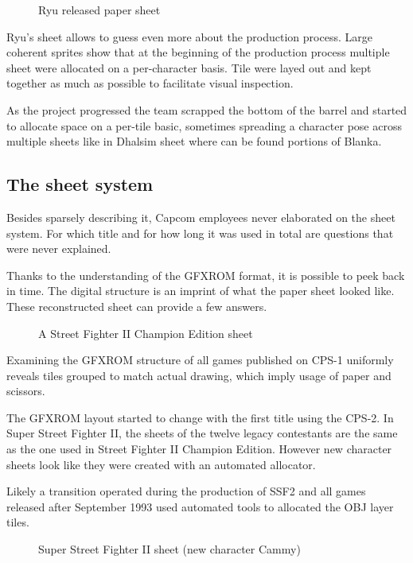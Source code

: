  \begin{figure}[H]
\caption*{Ryu released paper sheet}
\end{figure}

Ryu's sheet  allows to guess even more about the production process. Large coherent sprites show that at the beginning of the production process multiple sheet were allocated on a per-character basis. Tile were layed out and kept together as much as possible to facilitate visual inspection.

As the project progressed the team scrapped the bottom of the barrel and started to allocate space on a per-tile basic, sometimes spreading a character pose across multiple sheets like in Dhalsim sheet where can be found portions of Blanka.

\subsection{The sheet system}
Besides sparsely describing it, Capcom employees never elaborated on the sheet system. For which title and for how long it was used in total are questions that were never explained.

Thanks to the understanding of the GFXROM format, it is possible to peek back in time. The digital structure is an imprint of what the paper sheet looked like. These reconstructed sheet can provide a few answers.

 \begin{figure}[H]
\caption*{A Street Fighter II Champion Edition sheet}
\end{figure}

Examining the GFXROM structure of all games published on CPS-1 uniformly reveals tiles grouped to match actual drawing, which imply usage of paper and scissors.

The GFXROM layout started to change with the first title using the CPS-2. In Super Street Fighter II, the sheets of the twelve legacy contestants are the same as the one used in Street Fighter II Champion Edition. However new character sheets look like they were created with an automated allocator.

Likely a transition operated during the production of SSF2 and all games released after September 1993 used automated tools to allocated the OBJ layer tiles.

 \begin{figure}[H]
\caption*{Super Street Fighter II sheet (new character Cammy)}
\end{figure}

